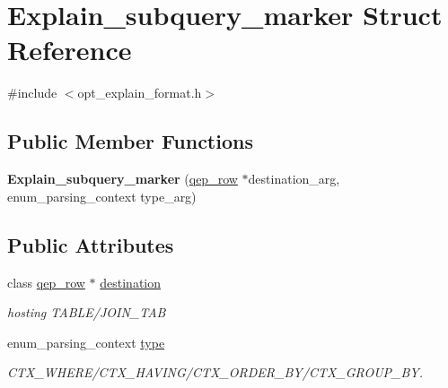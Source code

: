 \hypertarget{structExplain__subquery__marker}{}\section{Explain\+\_\+subquery\+\_\+marker Struct Reference}
\label{structExplain__subquery__marker}


{\ttfamily \#include $<$opt\+\_\+explain\+\_\+format.\+h$>$}

\subsection*{Public Member Functions}
\begin{DoxyCompactItemize}
\item 
\mbox{\label{structExplain__subquery__marker_a962608cd0e4c868445385782fac91fbc}} 
{\bfseries Explain\+\_\+subquery\+\_\+marker} (\mbox{\hyperlink{classqep__row}{qep\+\_\+row}} $\ast$destination\+\_\+arg, enum\+\_\+parsing\+\_\+context type\+\_\+arg)
\end{DoxyCompactItemize}
\subsection*{Public Attributes}
\begin{DoxyCompactItemize}
\item 
\mbox{\label{structExplain__subquery__marker_a85f0d6a61332fac1cdc6822b068a93bd}} 
class \mbox{\hyperlink{classqep__row}{qep\+\_\+row}} $\ast$ \mbox{\hyperlink{structExplain__subquery__marker_a85f0d6a61332fac1cdc6822b068a93bd}{destination}}
\begin{DoxyCompactList}\small\item\em hosting T\+A\+B\+L\+E/\+J\+O\+I\+N\+\_\+\+T\+AB \end{DoxyCompactList}\item 
\mbox{\label{structExplain__subquery__marker_a836ecc1ba7d92d23d0b5c1820c2cfc8f}} 
enum\+\_\+parsing\+\_\+context \mbox{\hyperlink{structExplain__subquery__marker_a836ecc1ba7d92d23d0b5c1820c2cfc8f}{type}}
\begin{DoxyCompactList}\small\item\em C\+T\+X\+\_\+\+W\+H\+E\+R\+E/\+C\+T\+X\+\_\+\+H\+A\+V\+I\+N\+G/\+C\+T\+X\+\_\+\+O\+R\+D\+E\+R\+\_\+\+B\+Y/\+C\+T\+X\+\_\+\+G\+R\+O\+U\+P\+\_\+\+BY. \end{DoxyCompactList}\end{DoxyCompactItemize}


